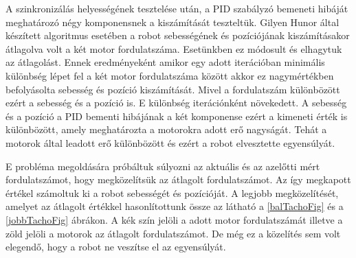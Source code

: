 A szinkronizálás helyességének tesztelése után, a PID szabályzó bemeneti hibáját meghatározó négy komponensnek a kiszámítását teszteltük. Gilyen Hunor által készített algoritmus esetében a robot sebességének és pozíciójának kiszámításakor átlagolva volt a két motor fordulatszáma. Esetünkben ez módosult és elhagytuk az átlagolást. Ennek eredményeként amikor egy adott iterációban minimális különbség lépet fel a két motor fordulatszáma között akkor ez nagymértékben befolyásolta sebesség és pozíció kiszámítását. Mivel a fordulatszám különbözött ezért a sebesség és a pozíció is. E különbség iterációnként növekedett. A sebesség és a pozíció a PID bementi hibájának a két komponense ezért a kimeneti érték is különbözött, amely meghatározta a motorokra adott erő nagyságát. Tehát a motorok által leadott erő különbözött és ezért a robot elvesztette egyensúlyát.

E probléma megoldására próbáltuk súlyozni az aktuális és az azelőtti mért fordulatszámot, hogy megközelítsük az átlagolt fordulatszámot. Az így megkapott értékel számoltuk ki a robot sebességét és pozícióját. A legjobb megközelítését, amelyet az átlagolt értékkel hasonlítottunk össze az látható a \ref{balTachoFig} és a \ref{jobbTachoFig} ábrákon. A kék szín jelöli a adott motor fordulatszámát illetve a zöld jelöli a motorok az átlagolt fordulatszámot. De még ez a közelítés sem volt elegendő, hogy a robot ne veszítse el az egyensúlyát.







 
